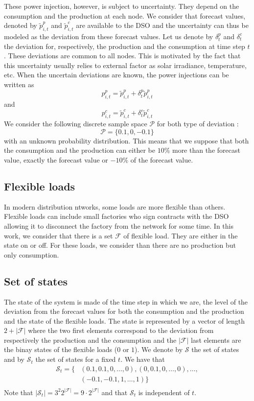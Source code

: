 These power injection, however, is subject to uncertainty.
They depend on the consumption and the production at each node.
We consider that forecast values, denoted by $\tilde{p}_{i,t}^p$ and $\tilde{p}_{i,t}^c$ are available to the DSO and the uncertainty can thus be modeled as the deviation from these forecast values.
Let us denote by $\delta_t^p$ and $\delta_t^c$ the deviation for, respectively, the production and the consumption at time step $t$.
These deviations are common to all nodes.
This is motivated by the fact that this uncertainty usually relies to external factor as solar irradiance, temperature, etc.
When the uncertain deviations are known, the power injections can be written as
\[
   p_{i,t}^p = \tilde{p}_{i,t}^p + \delta_t^p\tilde{p}_{i,t}^p
  \]
and
\[
   p_{i,t}^c = \tilde{p}_{i,t}^c + \delta_t^c\tilde{p}_{i,t}^c
  \]
We consider the following discrete sample space $\mathcal{P}$ for both type of deviation :
\[
  \mathcal{P} = \{0.1, 0, -0.1\}
\]
with an unknown probability distribution.
This means that we suppose that both the consumption and the production can either be $10\%$ more than the forecast value, exactly the forecast value or $-10\%$ of the forecast value.

\subsection{Flexible loads}
In modern distribution ntworks, some loads are more flexible than others.
Flexible loads can include small factories who sign contracts with the DSO allowing it to disconnect the factory from the network for some time.
In this work, we consider that there is a set $\mathcal{F}$ of flexible load.
They are either in the state on or off.
For these loads, we consider than there are no production but only consumption.

\subsection{Set of states}

The state of the system is made of the time step in which we are, the level of the deviation from the forecast values for both the consumption and the production and the state of the flexible loads.
The state is represented by a vector of length $2+|\mathcal{F}|$ where the two first elements correspond to the deviation from respectively the production and the consumption and the $|\mathcal{F}|$ last elements are the binay states of the flexible loads ($0$ or $1$).
We denote by $\mathcal{S}$ the set of states and by $\mathcal{S}_t$ the set of states for a fixed $t$.
We have that
\begin{align*}
  \mathcal{S}_t = \{&(0.1, 0.1, 0, \dots, 0), (0, 0.1,0, \dots, 0), \dots, \\
                    &(-0.1, -0.1,1, \dots, 1)\} \\
\end{align*}
Note that $|\mathcal{S}_t| = 3^2 2^{|\mathcal{F}|} = 9 \cdot 2^{|\mathcal{F}|}$ and that $\mathcal{S}_t$ is independent of $t$.

